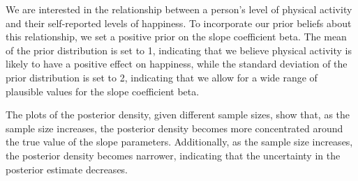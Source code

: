\documentclass[
  a4paper,
]{article}
\begin{document}
We are interested in the relationship between a person's level of
physical activity and their self-reported levels of happiness. To
incorporate our prior beliefs about this relationship, we set a positive
prior on the slope coefficient beta. The mean of the prior distribution
is set to 1, indicating that we believe physical activity is likely to
have a positive effect on happiness, while the standard deviation of the
prior distribution is set to 2, indicating that we allow for a wide
range of plausible values for the slope coefficient beta.

The plots of the posterior density, given different sample sizes, show
that, as the sample size increases, the posterior density becomes more
concentrated around the true value of the slope parameters.
Additionally, as the sample size increases, the posterior density
becomes narrower, indicating that the uncertainty in the posterior
estimate decreases.
\end{document}

